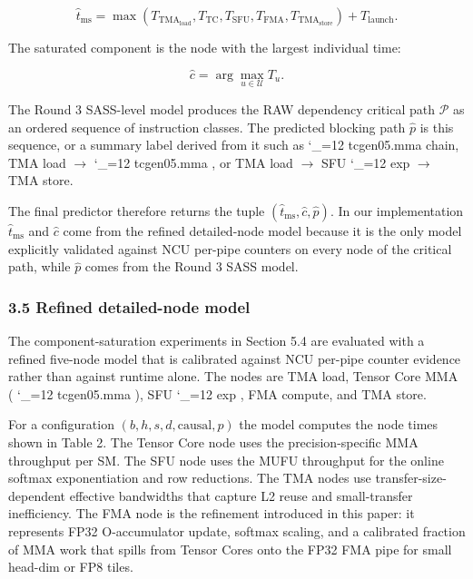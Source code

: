 \documentclass[
  10pt,journal,compsoc,twoside]{IEEEtran}
\renewcommand{\texttt}[1]{%
  \begingroup
  \ttfamily
  \catcode`_=12
  \def\_{\char`\_\allowbreak}%
  #1%
  \endgroup
}
\begin{document}
\[\hat{t}_{\text{ms}} = \max\left(T_{\text{TMA}_{\text{load}}}, T_{\text{TC}}, T_{\text{SFU}}, T_{\text{FMA}}, T_{\text{TMA}_{\text{store}}}\right) + T_{\text{launch}}.
\]

The saturated component is the node with the largest individual time:

\[\hat{c} = \arg\max_{u \in \mathcal{U}} T_u.
\]

The Round 3 SASS-level model produces the RAW dependency critical path
\(\mathcal{P}\) as an ordered sequence of instruction classes. The
predicted blocking path \(\hat{p}\) is this sequence, or a summary label
derived from it such as \texttt{tcgen05.mma} chain, TMA load
\(\rightarrow\) \texttt{tcgen05.mma}, or TMA load \(\rightarrow\) SFU
\texttt{exp} \(\rightarrow\) TMA store.

The final predictor therefore returns the tuple
\((\hat{t}_{\text{ms}}, \hat{c}, \hat{p})\). In our implementation
\(\hat{t}_{\text{ms}}\) and \(\hat{c}\) come from the refined
detailed-node model because it is the only model explicitly validated
against NCU per-pipe counters on every node of the critical path, while
\(\hat{p}\) comes from the Round 3 SASS model.

\subsubsection{3.5 Refined detailed-node
model}\label{refined-detailed-node-model}

The component-saturation experiments in Section 5.4 are evaluated with a
refined five-node model that is calibrated against NCU per-pipe counter
evidence rather than against runtime alone. The nodes are TMA load,
Tensor Core MMA (\texttt{tcgen05.mma}), SFU \texttt{exp}, FMA compute,
and TMA store.

For a configuration \((b, h, s, d, \text{causal}, p)\) the model
computes the node times shown in Table 2. The Tensor Core node uses the
precision-specific MMA throughput per SM. The SFU node uses the MUFU
throughput for the online softmax exponentiation and row reductions. The
TMA nodes use transfer-size-dependent effective bandwidths that capture
L2 reuse and small-transfer inefficiency. The FMA node is the refinement
introduced in this paper: it represents FP32 O-accumulator update,
softmax scaling, and a calibrated fraction of MMA work that spills from
Tensor Cores onto the FP32 FMA pipe for small head-dim or FP8 tiles.
\end{document}
